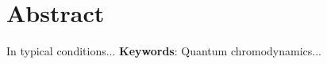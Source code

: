 \chapter*{\hspace{6.2cm}Abstract}\label{chp:abstract}
\thispagestyle{headings}
\thispagestyle{empty} 

{
In typical conditions...
\textbf{Keywords}: Quantum chromodynamics...
}